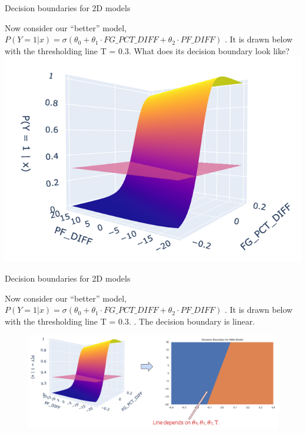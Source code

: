 \documentclass[aspectratio=169]{../latex_main/tntbeamer}  %
\begin{document}
	
	\begin{frame}{Decision boundaries for 2D models}
	
	Now consider our “better” model, $ P(Y=1|x) = \sigma (\theta_0  + \theta_1 \cdot FG\_PCT\_DIFF + \theta_2 \cdot PF\_DIFF)$                                                    . It is drawn below with the thresholding line T = 0.3. What does its decision boundary look like?\\
        \includegraphics[scale=.5]{Bild36}
	     
	\end{frame}
	
	
	\begin{frame}{Decision boundaries for 2D models}
	
	Now consider our “better” model, $ P(Y=1|x) = \sigma (\theta_0  + \theta_1 \cdot FG\_PCT\_DIFF + \theta_2 \cdot PF\_DIFF)$                                                    . It is drawn below with the thresholding line T = 0.3. . The decision boundary is linear. \\
	
        \begin{figure}
            \centering
            \includegraphics[scale=.35]{Bild37}
        \end{figure}
	     
	\end{frame}
	
\end{document}
